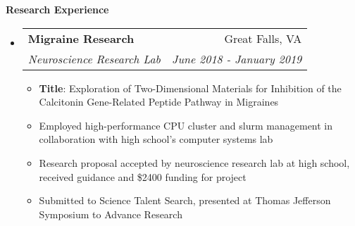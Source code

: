 \documentclass[letterpaper,11pt]{article}
\makeatletter
\newcommand{\resitem}[1]{\item #1 \vspace{-2pt}}
\newcommand{\resheading}[1]{{\large \colorbox{mygrey}{\begin{minipage}{\textwidth}{\textbf{#1 \vphantom{p\^{E}}}}\end{minipage}}}}
\newcommand{\ressubheading}[4]{
\begin{tabular*}{7.0in}{l@{\extracolsep{\fill}}r}
		\textbf{#1} & #2 \\
		\textit{#3} & \textit{#4} \\
\end{tabular*}\vspace{-6pt}}
\makeatother
\begin{document}

\resheading{Research Experience}
\begin{itemize}
\item
	\ressubheading{Migraine Research}{Great Falls, VA}{Neuroscience Research Lab}{June 2018 - January 2019}
	\begin{itemize}
		\resitem{\textbf{Title}: Exploration of Two-Dimensional Materials for Inhibition of the Calcitonin Gene-Related Peptide Pathway in Migraines}
	    \resitem{Employed high-performance CPU cluster and slurm management in collaboration with high school's computer systems lab}
	    \resitem{Research proposal accepted by neuroscience research lab at high school, received guidance and \$2400 funding for project}
	    \resitem{Submitted to Science Talent Search, presented at Thomas Jefferson Symposium to Advance Research}
	\end{itemize}

\end{itemize}
\end{document}

